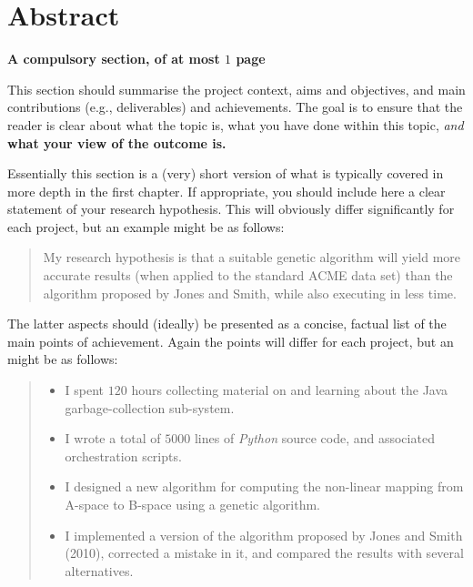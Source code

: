 \documentclass[ %
                    author={Carlos Duran Calle},
                supervisor={Dr. Felipe Campelo},
                    degree={MSc},
                     title={Comparative Machine Learning Analysis for Student Dropout Prediction in a Virtual Learning Environment},
                  subtitle={Incorporating Student Engagement and Socio-Economic Features},
                      type={},
                      year={2025}]{dissertation}
\begin{document}

\chapter*{Abstract}

{\bf A compulsory section, of at most $1$ page} 
\vspace{1cm} 

\noindent
This section should summarise the project context, aims and objectives,
and main contributions (e.g., deliverables) and achievements.  The goal is to ensure that the 
reader is clear about what the topic is, what you have done within this 
topic, {\em and}\/ {\bf what your view of the outcome is.}

Essentially 
this section is a (very) short version of what is typically covered in more depth in the first 
chapter.  If appropriate, you should include here  
a clear statement of your research hypothesis.  This will obviously differ significantly
for each project, but an example might be as follows:

\begin{quote}
My research hypothesis is that a suitable genetic algorithm will yield
more accurate results (when applied to the standard ACME data set) than 
the algorithm proposed by Jones and Smith, while also executing in less
time.
\end{quote}

\noindent
The latter aspects should (ideally) be presented as a concise, factual 
list of the main points of achievement.  Again the points will differ for each project, but 
an might be as follows:

\begin{quote}
\noindent
\begin{itemize}
\item I spent $120$ hours collecting material on and learning about the 
      Java garbage-collection sub-system. 
\item I wrote a total of $5000$ lines of {\em Python} source code, and associated orchestration scripts. 
\item I designed a new algorithm for computing the non-linear mapping 
      from A-space to B-space using a genetic algorithm.
\item I implemented a version of the algorithm proposed by Jones and 
      Smith (2010), corrected a mistake in it, and 
      compared the results with several alternatives.
\end{itemize}
\end{quote}
\end{document}
